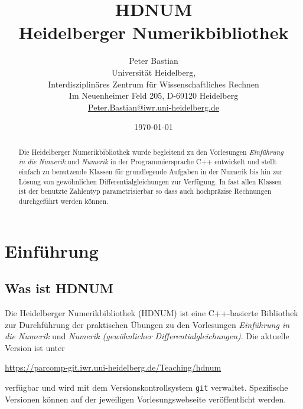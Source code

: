 \documentclass[a4paper,11pt]{article}
\title{HDNUM\\ Heidelberger Numerikbibliothek}
\author{Peter Bastian\\
  Universität Heidelberg, \\
  Interdisziplinäres Zentrum für Wissenschaftliches Rechnen\\
  Im Neuenheimer Feld 205, D-69120 Heidelberg\\
  \url{Peter.Bastian@iwr.uni-heidelberg.de}
}
\date{\today}
\theoremstyle{definition}
\begin{document}
\maketitle



\begin{abstract}
Die Heidelberger Numerikbibliothek wurde begleitend zu den Vorlesungen
\textit{Einführung in die Numerik} und \textit{Numerik} in der Programmiersprache C++
entwickelt und stellt
einfach zu benutzende Klassen für grundlegende Aufgaben in der Numerik bis hin zur Lösung
von gewöhnlichen Differentialgleichungen zur Verfügung. In fast allen Klassen ist der
benutzte Zahlentyp parametrisierbar so dass auch hochpräzise Rechnungen durchgeführt werden können.
\end{abstract}


\section{Einführung}

\subsection{Was ist HDNUM}

Die Heidelberger Numerikbibliothek (HDNUM) ist eine C++-basierte Bibliothek
zur Durchführung der praktischen Übungen zu den Vorlesungen \textit{Einführung in die
Numerik} und \textit{Numerik (gewöhnlicher Differentialgleichungen)}. Die aktuelle Version ist
unter
\begin{center}
\url{https://parcomp-git.iwr.uni-heidelberg.de/Teaching/hdnum}
\end{center}
verfügbar und wird mit dem Versionskontrollsystem \lstinline{git} verwaltet.
Spezifische Versionen können auf der jeweiligen Vorlesungswebseite veröffentlicht werden.
\end{document}
